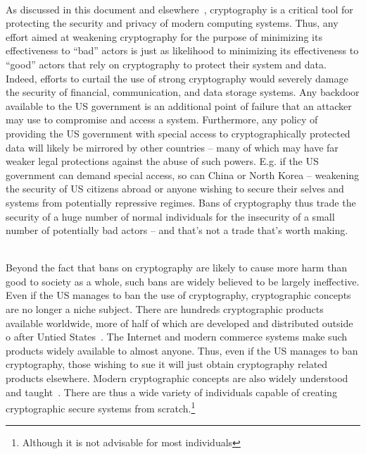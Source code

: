 \begin{packed_desc}
\item[More Harm Than Good] \hfill \\ As discussed in this document and
  elsewhere~\cite{abelson2015}, cryptography is a critical tool for
  protecting the security and privacy of modern computing
  systems. Thus, any effort aimed at weakening cryptography for the
  purpose of minimizing its effectiveness to ``bad'' actors is just as
  likelihood to minimizing its effectiveness to ``good'' actors that
  rely on cryptography to protect their system and data. Indeed,
  efforts to curtail the use of strong cryptography would severely
  damage the security of financial, communication, and data storage
  systems. Any backdoor available to the US government is an
  additional point of failure that an attacker may use to compromise
  and access a system. Furthermore, any policy of providing the US
  government with special access to cryptographically protected data
  will likely be mirrored by other countries -- many of which may have
  far weaker legal protections against the abuse of such
  powers. E.g. if the US government can demand special access, so can
  China or North Korea -- weakening the security of US citizens abroad
  or anyone wishing to secure their selves and systems from
  potentially repressive regimes. Bans of cryptography thus trade the
  security of a huge number of normal individuals for the insecurity
  of a small number of potentially bad actors -- and that's not a
  trade that's worth making.
\item[Ineffectiveness] \hfill \\ Beyond the fact that bans on
  cryptography are likely to cause more harm than good to society as a
  whole, such bans are widely believed to be largely ineffective. Even
  if the US manages to ban the use of cryptography, cryptographic
  concepts are no longer a niche subject. There are hundreds
  cryptographic products available worldwide, more of half of which
  are developed and distributed outside o after Untied
  States~\cite{schneier2016}. The Internet and modern commerce systems
  make such products widely available to almost anyone. Thus, even if
  the US manages to ban cryptography, those wishing to sue it will
  just obtain cryptography related products elsewhere. Modern
  cryptographic concepts are also widely understood and
  taught~\cite{schneier2010crypto}. There are thus a wide variety of
  individuals capable of creating cryptographic secure systems from
  scratch.\footnote{Although it is not advisable for most individuals
}
\end{packed_desc}
